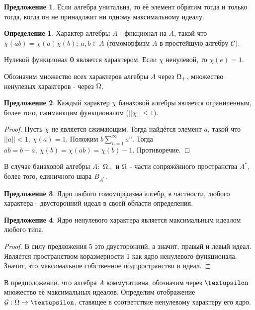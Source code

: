 \documentclass[12pt]{extarticle}
\theoremstyle{definition}
\newtheorem{definition}{\indent Определение}[section]
\newtheorem{suggestion}{\indent Предложение}[section]
\begin{document}
    \begin{suggestion}
    Если алгебра унитальна, то её элемент обратим тогда и только тогда, когда он не принадлжит ни одному максимальному идеалу.
    \end{suggestion}
    
    \begin{definition}
    Характер алгебры $A$ - фнкционал на $A$, такой что $\chi(ab) = \chi(a)\chi(b);\ a,b \in A$ (гомоморфизм $A$ в простейшую алгебру $\mathcal{C}$).
    \end{definition}
    
    Нулевой функционал \textbf{0} является характером. Если $\chi$ ненулевой, то $\chi(e) = 1$.
    
    Обозначим множество всех характеров алгебры $A$ через $\ohm_+$, множество ненулевых характеров - через $\ohm$.
    
    \begin{suggestion}
    Каждый характер $\chi$ банаховой алгебры является ограниченным, более того, сжимающим функционалом ($||\chi|| \leq 1$).
    \end{suggestion}
    \begin{proof}
    Пусть $\chi$ не является сжимающим. Тогда найдётся элемент $a$, такой что $||a|| < 1,\ \chi(a) = 1$. Положим $b \sum \limits_{n=1}^{\infty}a^n$. Тогда $ab = b - a,\ \chi(b) = \chi(ab) = \chi(b) - 1$. Противоречие. 
    \end{proof}
    
    В случае банаховой алгебры $A$:\ $\ohm_+$ и $\ohm$ - части сопряжённого пространства $A^*$, более того, единичного шара $B_{A^*}$.
    
       \begin{suggestion}
    Ядро любого гомоморфизма алгебр, в частности, любого характера - двусторонний идеал в своей области определения.
    \end{suggestion} 
    
    \begin{suggestion}
    Ядро ненулевого характера является максимальным идеалом любого типа.
    \end{suggestion} 
    \begin{proof}
    В силу предложения 5 это двусторонний, а значит, правый и левый идеал. Является пространством коразмерности 1 как ядро ненулевого функционала. Значит, это максимальное собственное подпространство и идеал.
    \end{proof}
    
    В предположении, что алгебра $A$ коммутативна, обозначим через $\textupsilon$ множество её максимальных идеалов. Определим отображение $\mathcal{G}: \ohm \rightarrow \textupsilon$, ставящее в соответствие ненулевому характеру его ядро.
    
\end{document}

